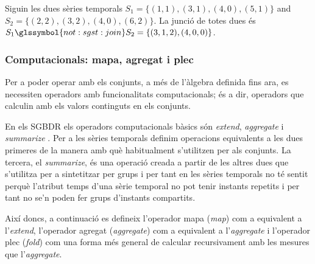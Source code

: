 \begin{example}\label{ex:model:s1s2}
  Siguin les dues sèries temporals $S_1=\{(1,1),(3,1),(4,0),(5,1)\}$
  and $S_2=\{(2,2),(3,2),(4,0),(6,2)\}$.  La junció de totes dues és
  $S_1 \glssymbol{not:sgst:join} S_2 = \{(3,1,2),(4,0,0)\}$.
\end{example}



\subsubsection{Computacionals: mapa, agregat i plec}



Per a poder operar amb els conjunts, a més de l'àlgebra definida fins
ara, es necessiten operadors amb funcionalitats computacionals; és a
dir, operadors que calculin amb els valors continguts en els conjunts. 

En els \gls{SGBDR} els operadors computacionals bàsics són
\emph{extend}, \emph{aggregate} i
\emph{summarize} \parencite[cap.~7]{date04:introduction8}.  Per a les
sèries temporals definim operacions equivalents a les dues primeres de
la manera amb què habitualment s'utilitzen per als conjunts. La
tercera, el \emph{summarize}, és una operació creada a partir de les
altres dues que s'utilitza per a sintetitzar per grups i per tant en
les sèries temporals no té sentit perquè l'atribut temps d'una sèrie
temporal no pot tenir instants repetits i per tant no se'n poden fer
grups d'instants compartits. 


Així doncs, a continuació es defineix l'operador mapa (\emph{map}) com
a equivalent a l'\emph{extend}, l'operador agregat (\emph{aggregate})
com a equivalent a l'\emph{aggregate} i l'operador plec (\emph{fold})
com una forma més general de calcular recursivament amb les mesures
que l'\emph{aggregate}.




